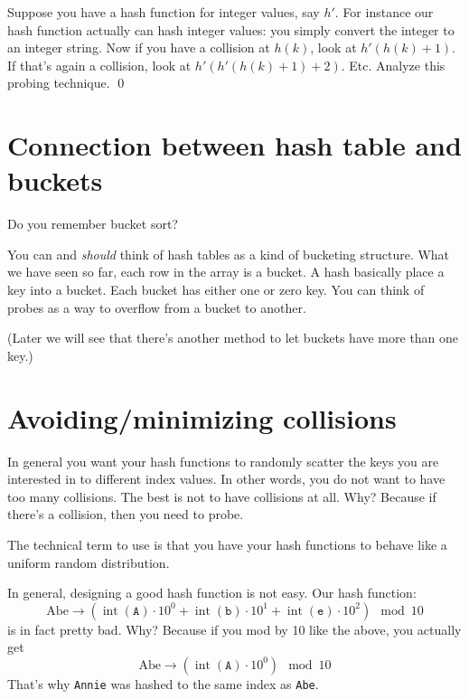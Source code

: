 \begin{ex}
Suppose you have a hash function for integer values, say $h'$.
For instance our hash function
actually can hash integer values: you simply convert the 
integer to an integer string. 
Now if you have a collision at $h(k)$, look at $h'(h(k) + 1)$.
If that's again a collision, look at $h'(h'(h(k) + 1) + 2)$.
Etc.
Analyze this probing technique.
\qed
\end{ex}




\newpage
\section{Connection between hash table and buckets}

Do you remember bucket sort?

You can and \textit{should} think of hash tables
as a kind of bucketing structure.
What we have seen so far, each row in the array is a bucket.
A hash basically place a key into a bucket.
Each bucket has either one or zero key.
You can think of probes as a way to overflow from a bucket to another.

(Later we will see that there's another method to let buckets
have more than one key.)




\newpage
\section{Avoiding/minimizing collisions}

In general you want your hash functions to randomly
scatter the keys you are interested in to different index values.
In other words, you do not want to have too many collisions.
The best is not to have collisions at all.
Why?
Because if there's a collision, then you need to probe.

The technical term to use is that you have your
hash functions to behave like a uniform random distribution.

In general, designing a good hash function is not easy.
Our hash function:
\[
\text{Abe}
\rightarrow
(\operatorname{int}(\texttt{A}) \cdot 10^0 +
\operatorname{int}(\texttt{b}) \cdot 10^1 +
\operatorname{int}(\texttt{e}) \cdot 10^2) 
\mod 10
\]
is in fact pretty bad.
Why?
Because if you mod by 10 like the above, you actually get
\[
\text{Abe}
\rightarrow
(\operatorname{int}(\texttt{A}) \cdot 10^0)
\mod 10
\]
That's why \verb!Annie! was hashed to the same index as \verb!Abe!.


